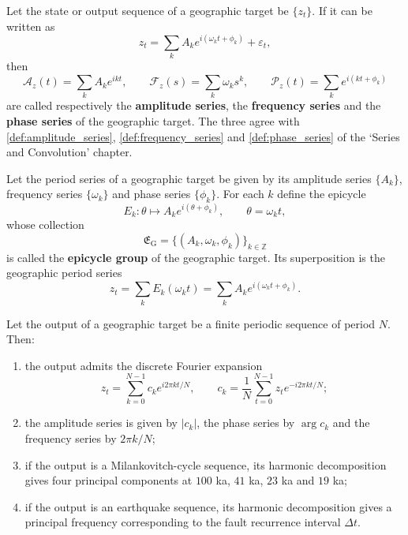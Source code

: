 \begin{definition}\label{def:geo_series}
Let the state or output sequence of a geographic target be $\{z_t\}$. If it can be written as
\[
z_t=\sum_k A_k e^{i(\omega_k t+\phi_k)}+\varepsilon_t,
\]
then
\[
\mathcal A_z(t)=\sum_k A_k e^{ikt},\qquad
\mathcal F_z(s)=\sum_k \omega_k s^k,\qquad
\mathcal P_z(t)=\sum_k e^{i(kt+\phi_k)}
\]
are called respectively the \textbf{amplitude series}, the \textbf{frequency series} and the \textbf{phase series} of the geographic target. The three agree with \cref{def:amplitude_series}, \cref{def:frequency_series} and \cref{def:phase_series} of the `Series and Convolution' chapter.
\end{definition}

\begin{definition}\label{def:geo_epicycle_group}
Let the period series of a geographic target be given by its amplitude series $\{A_k\}$, frequency series $\{\omega_k\}$ and phase series $\{\phi_k\}$. For each $k$ define the epicycle
\[
E_k:\theta\mapsto A_k e^{i(\theta+\phi_k)},\qquad \theta=\omega_k t,
\]
whose collection
\[
\mathfrak E_{\mathrm{G}}=\{(A_k,\omega_k,\phi_k)\}_{k\in\mathbb Z}
\]
is called the \textbf{epicycle group} of the geographic target. Its superposition is the geographic period series
\[
z_t=\sum_k E_k(\omega_k t)=\sum_k A_k e^{i(\omega_k t+\phi_k)}.
\]
\end{definition}

\begin{theorem}\label{thm:geo_series_reconstruction}
Let the output of a geographic target be a finite periodic sequence of period $N$. Then:
\begin{enumerate}[label=(\roman*)]
    \item the output admits the discrete Fourier expansion
    \[
    z_t=\sum_{k=0}^{N-1}c_k e^{i2\pi kt/N},\qquad
    c_k=\frac1N\sum_{t=0}^{N-1}z_t e^{-i2\pi kt/N};
    \]
    \item the amplitude series is given by $|c_k|$, the phase series by $\arg c_k$ and the frequency series by $2\pi k/N$;
    \item if the output is a Milankovitch-cycle sequence, its harmonic decomposition gives four principal components at $100$ ka, $41$ ka, $23$ ka and $19$ ka;
    \item if the output is an earthquake sequence, its harmonic decomposition gives a principal frequency corresponding to the fault recurrence interval $\Delta t$.
\end{enumerate}
\end{theorem}

